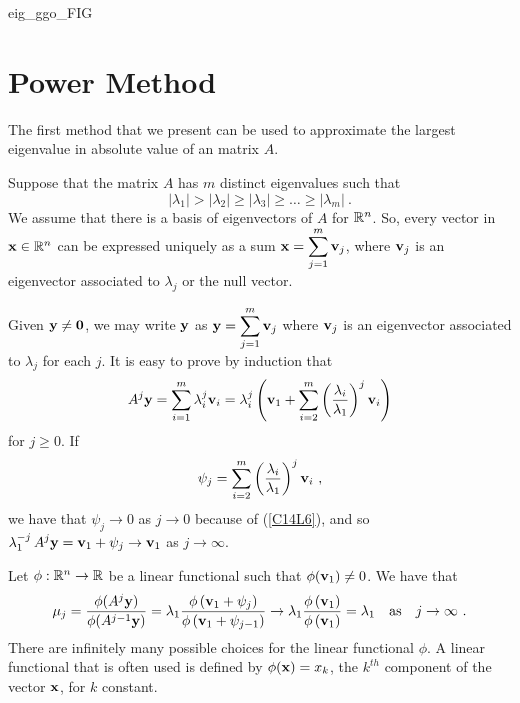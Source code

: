 {eig_ggo_FIG}

\section{Power Method}

The first method that we present can be used to approximate the largest
eigenvalue in absolute value of an  matrix $A$.

Suppose that the \nn matrix $A$ has $m$ distinct eigenvalues such that
\begin{equation} \label{C14L6}
|\lambda_1| > |\lambda_2| \geq |\lambda_3| \geq \ldots \geq |\lambda_m| \ .
\end{equation}
We assume that there is a basis of eigenvectors of $A$ for $\mathbb{R}^n$.
So, every vector in $\mathbf{x} \in \mathbb{R}^n$ can be expressed uniquely as a
sum $\displaystyle \mathbf{x} = \sum_{j=1}^m \mathbf{v}_j$, where
$\mathbf{v}_j$ is an eigenvector associated to $\lambda_j$ or the null
vector.

Given $\mathbf{y} \neq \mathbf{0}$, we may write $\mathbf{y}$ as
$\displaystyle \mathbf{y} = \sum_{j=1}^m \mathbf{v}_j$ where
$\mathbf{v}_j$ is an eigenvector associated to $\lambda_j$ for each $j$.
It is easy to prove by induction that
\[
A^j \mathbf{y} = \sum_{i=1}^m  \lambda_i^j \mathbf{v}_i
= \lambda_i^j \left(\mathbf{v}_1 + \sum_{i=2}^m
\left(\frac{\lambda_i}{\lambda_1}\right)^j \mathbf{v}_i \right)
\]
for $j\geq 0$.  If
\[
\psi_j = \sum_{i=2}^m \left(\frac{\lambda_i}{\lambda_1}\right)^j \mathbf{v}_i \ ,
\]
we have that $\psi_j \rightarrow 0$ as $j\rightarrow 0$ because of 
(\ref{C14L6}), and so
$\displaystyle \lambda_1^{-j}\, A^j\mathbf{y} = \mathbf{v}_1 + \psi_j \to \mathbf{v}_1$
as $j \rightarrow \infty$.

Let $\phi:\mathbb{R}^n \rightarrow \mathbb{R}$ be a linear functional
such that $\phi(\mathbf{v}_1) \neq 0$.  We have that
\[
\mu_j = \frac{\phi(A^j\mathbf{y})}{\phi(A^{j-1}\mathbf{y})}
= \lambda_1 \frac{\phi\left( \mathbf{v}_1 + \psi_j \right)}
{\phi\left( \mathbf{v}_1 + \psi_{j-1}\right)} \rightarrow
\lambda_1 \frac{\phi\left( \mathbf{v}_1\right)}
{\phi\left( \mathbf{v}_1\right)} = \lambda_1
\quad \text{as} \quad j\rightarrow \infty \ .
\]
There are infinitely many possible choices for the linear functional
$\phi$.  A linear functional that is often used is defined by
$\phi(\mathbf{x}) = x_k$, the $k^{th}$ component of the vector $\mathbf{x}$,
for $k$ constant.

